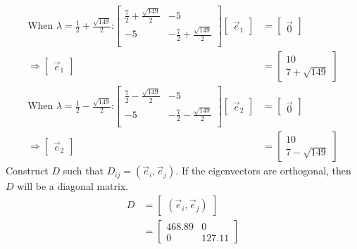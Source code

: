 \documentclass[11pt]{homework}
\begin{document}
\begin{align*}
  \text{When $\lambda = \frac{1}{2} + \frac{\sqrt{149}}{2}$:}
  \begin{bmatrix}
    \frac{7}{2} + \frac{\sqrt{149}}{2} & -5 \\
    -5                                & -\frac{7}{2} + \frac{\sqrt{149}}{2} \\
  \end{bmatrix}
  \begin{bmatrix}
    \vec e_1
  \end{bmatrix}
  &=
  \begin{bmatrix}
    \vec 0
  \end{bmatrix} \\
  \Rightarrow
  \begin{bmatrix}
    \vec e_1
  \end{bmatrix}
  &=
  \begin{bmatrix}
  10 \\
  7 + \sqrt{149}
  \end{bmatrix} \\
  \text{When $\lambda = \frac{1}{2} - \frac{\sqrt{149}}{2}$:}
  \begin{bmatrix}
    \frac{7}{2} - \frac{\sqrt{149}}{2} & -5 \\
    -5                                & -\frac{7}{2} - \frac{\sqrt{149}}{2} \\
  \end{bmatrix}
  \begin{bmatrix}
    \vec e_2
  \end{bmatrix}
  &=
  \begin{bmatrix}
    \vec 0
  \end{bmatrix} \\
  \Rightarrow
  \begin{bmatrix}
    \vec e_2
  \end{bmatrix}
  &=
  \begin{bmatrix}
  10 \\
  7 - \sqrt{149}
  \end{bmatrix}
\end{align*}
Construct $D$ such that $D_{ij} = (\vec e_i, \vec e_j)$. 
If the eigenvectors are orthogonal, 
then $D$ will be a diagonal matrix.
\begin{align*}
D &= 
  \begin{bmatrix}
  (\vec e_i, \vec e_j)
  \end{bmatrix} \\
  &=
  \begin{bmatrix}
  468.89 & 0 \\
  0      & 127.11
  \end{bmatrix}
\end{align*}
\end{document}
